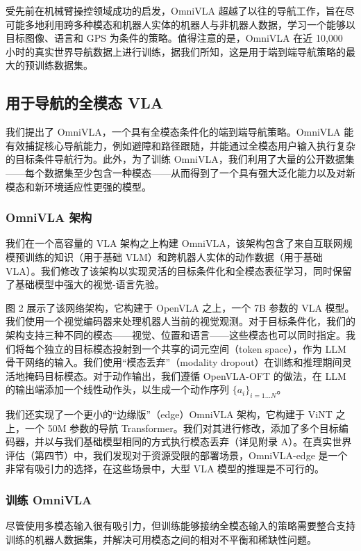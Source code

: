 受先前在机械臂操控领域成功的启发，OmniVLA 超越了以往的导航工作，旨在尽可能多地利用跨多种模态和机器人实体的机器人与非机器人数据，学习一个能够以目标图像、语言和 GPS 为条件的策略。值得注意的是，OmniVLA 在近 10,000 小时的真实世界导航数据上进行训练，据我们所知，这是用于端到端导航策略的最大的预训练数据集。

\subsection{用于导航的全模态 VLA}

我们提出了 OmniVLA，一个具有全模态条件化的端到端导航策略。OmniVLA 能有效捕捉核心导航能力，例如避障和路径跟随，并能通过全模态用户输入执行复杂的目标条件导航行为。此外，为了训练 OmniVLA，我们利用了大量的公开数据集——每个数据集至少包含一种模态——从而得到了一个具有强大泛化能力以及对新模态和新环境适应性更强的模型。

\subsubsection{OmniVLA 架构}

我们在一个高容量的 VLA 架构之上构建 OmniVLA，该架构包含了来自互联网规模预训练的知识（用于基础 VLM）和跨机器人实体的动作数据（用于基础 VLA）。我们修改了该架构以实现灵活的目标条件化和全模态表征学习，同时保留了基础模型中强大的视觉-语言先验。

图 2 展示了该网络架构，它构建于 OpenVLA 之上，一个 7B 参数的 VLA 模型。我们使用一个视觉编码器来处理机器人当前的视觉观测。对于目标条件化，我们的架构支持三种不同的模态——视觉、位置和语言——这些模态也可以同时指定。我们将每个独立的目标模态投射到一个共享的词元空间（token space），作为 LLM 骨干网络的输入。我们使用“模态丢弃”（modality dropout）在训练和推理期间灵活地掩码目标模态。对于动作输出，我们遵循 OpenVLA-OFT 的做法，在 LLM 的输出端添加一个线性动作头，以生成一个动作序列 $\{a_i\}_{i=1...N}$。

我们还实现了一个更小的“边缘版”（edge）OmniVLA 架构，它构建于 ViNT 之上，一个 50M 参数的导航 Transformer。我们对其进行修改，添加了多个目标编码器，并以与我们基础模型相同的方式执行模态丢弃（详见附录 A）。在真实世界评估（第四节）中，我们发现对于资源受限的部署场景，OmniVLA-edge 是一个非常有吸引力的选择，在这些场景中，大型 VLA 模型的推理是不可行的。

\subsubsection{训练 OmniVLA}

尽管使用多模态输入很有吸引力，但训练能够接纳全模态输入的策略需要整合支持训练的机器人数据集，并解决可用模态之间的相对不平衡和稀缺性问题。

